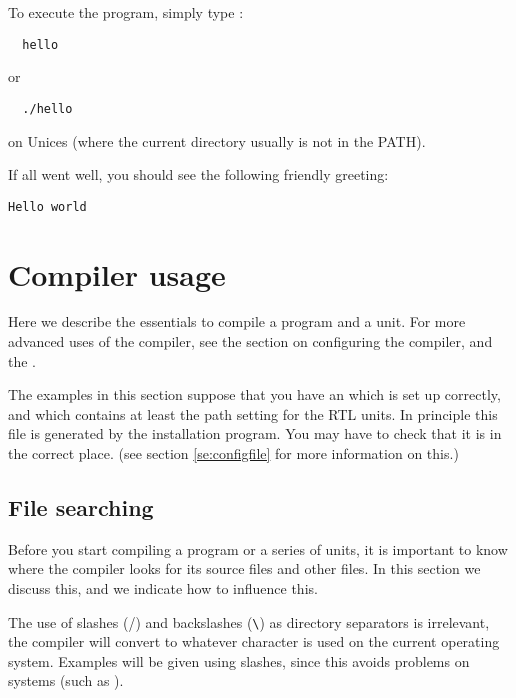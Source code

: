 To execute the program, simply type :
\begin{verbatim}
  hello
\end{verbatim}
or
\begin{verbatim}
  ./hello
\end{verbatim}
on Unices (where the current directory usually is not in the PATH).

If all went well, you should see the following friendly greeting:
\begin{verbatim}
Hello world
\end{verbatim}

\chapter{Compiler usage}
\label{ch:Usage}

Here we describe the essentials to compile a program and a unit.
For more advanced uses of the compiler, see the section on configuring
the compiler, and the \progref{}.

The examples in this section suppose that you have an  which
is set up correctly, and which contains at least the path setting for the
RTL units. In principle this file is generated by the installation program.
You may have to check that it is in the correct place. (see section
\ref{se:configfile} for more information on this.)

\section{File searching}
Before you start compiling a program or a series of units, it is
important to know where the compiler looks for its source files and other
files. In this section we discuss this, and we indicate how to influence
this.

\begin{remark}
The use of slashes (/) and backslashes (\verb+\+) as directory separators
is irrelevant, the compiler will convert to whatever character is used on
the current operating system. Examples will be given using slashes, since
this avoids problems on \unix systems (such as \linux).
\end{remark}

